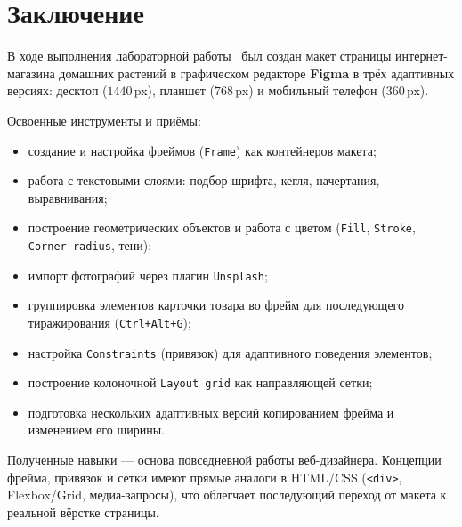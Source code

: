 \chapter*{Заключение}
\label{ch:conclusion}

В ходе выполнения лабораторной работы~\cfgLabNumber{} был создан макет
страницы интернет-магазина домашних растений в графическом редакторе
\textbf{Figma} в трёх адаптивных версиях: десктоп (\(1440\,\)px),
планшет (\(768\,\)px) и мобильный телефон (\(360\,\)px).

Освоенные инструменты и приёмы:
\begin{itemize}
  \item создание и настройка фреймов (\texttt{Frame}) как контейнеров
        макета;
  \item работа с текстовыми слоями: подбор шрифта, кегля, начертания,
        выравнивания;
  \item построение геометрических объектов и работа с цветом
        (\texttt{Fill}, \texttt{Stroke}, \texttt{Corner radius},
        тени);
  \item импорт фотографий через плагин \texttt{Unsplash};
  \item группировка элементов карточки товара во фрейм для последующего
        тиражирования (\texttt{Ctrl+Alt+G});
  \item настройка \texttt{Constraints} (привязок) для адаптивного
        поведения элементов;
  \item построение колоночной \texttt{Layout grid} как направляющей
        сетки;
  \item подготовка нескольких адаптивных версий копированием фрейма и
        изменением его ширины.
\end{itemize}

Полученные навыки --- основа повседневной работы веб-дизайнера. Концепции
фрейма, привязок и сетки имеют прямые аналоги в HTML/CSS
(\texttt{<div>}, Flexbox/Grid, медиа-запросы), что облегчает
последующий переход от макета к реальной вёрстке страницы.

\endinput
